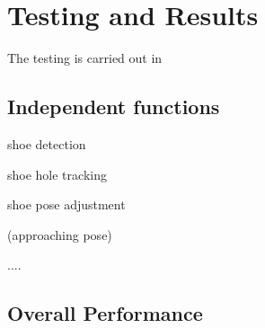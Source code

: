 \chapter{Testing and Results}

The testing is carried out in 

\section{Independent functions}

shoe detection

shoe hole tracking 

shoe pose adjustment

(approaching pose)

....

\section{Overall Performance}

